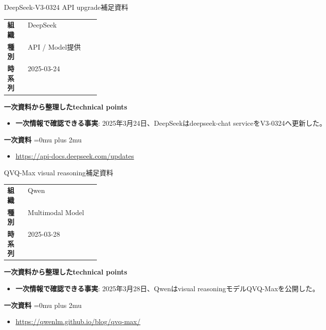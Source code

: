 \begin{technicalnote}{DeepSeek-V3-0324 API upgrade}{補足資料}
\begingroup
\begin{tabularx}{\linewidth}{@{}>{\bfseries}p{0.22\linewidth}X@{}}
組織 & DeepSeek \\
種別 & API / Model提供 \\
時系列 & 2025-03-24 \\
\end{tabularx}
\smallskip
{\bfseries 一次資料から整理したtechnical points}
\begin{itemize}[leftmargin=1.5em,itemsep=0.35em]
\item \textbf{一次情報で確認できる事実}: 2025年3月24日、DeepSeekはdeepseek-chat serviceをV3-0324へ更新した。
\end{itemize}
\begin{samepage}
{\bfseries 一次資料}
\begingroup\sloppy
\Urlmuskip=0mu plus 2mu\relax
\begin{itemize}[leftmargin=1.5em,itemsep=0.25em]
\item {\scriptsize\url{https://api-docs.deepseek.com/updates}}
\end{itemize}
\endgroup
\end{samepage}
\endgroup
\end{technicalnote}
\medskip

\begin{technicalnote}{QVQ-Max visual reasoning}{補足資料}
\begingroup
\begin{tabularx}{\linewidth}{@{}>{\bfseries}p{0.22\linewidth}X@{}}
組織 & Qwen \\
種別 & Multimodal Model \\
時系列 & 2025-03-28 \\
\end{tabularx}
\smallskip
{\bfseries 一次資料から整理したtechnical points}
\begin{itemize}[leftmargin=1.5em,itemsep=0.35em]
\item \textbf{一次情報で確認できる事実}: 2025年3月28日、Qwenはvisual reasoningモデルQVQ-Maxを公開した。
\end{itemize}
\begin{samepage}
{\bfseries 一次資料}
\begingroup\sloppy
\Urlmuskip=0mu plus 2mu\relax
\begin{itemize}[leftmargin=1.5em,itemsep=0.25em]
\item {\scriptsize\url{https://qwenlm.github.io/blog/qvq-max/}}
\end{itemize}
\endgroup
\end{samepage}
\endgroup
\end{technicalnote}
\medskip
